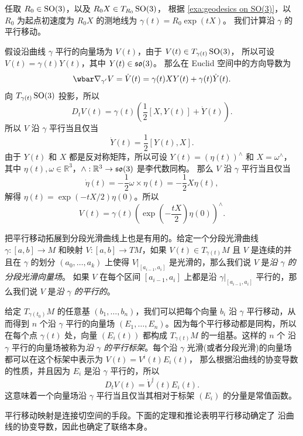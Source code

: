 \begin{example}[$\SO(3)$ 上的平行移动]
  任取 $R_0\in \operatorname{SO}(3)$，以及 $R_0X\in T_{R_0}\operatorname{SO}(3)$，
  根据 \autoref{exa:geodesics on SO(3)}，以 $R_0$ 为起点初速度为 $R_0X$ 的测地线为 $\gamma(t)=R_0\exp(tX)$。
  我们计算沿 $\gamma$ 的平行移动。

  假设沿曲线 $\gamma$ 平行的向量场为 $V(t)$，由于 $V(t)\in T_{\gamma(t)}\operatorname{SO}(3)$，
  所以可设 $V(t)=\gamma(t) Y(t)$，其中 $Y(t)\in\mathfrak{so}(3)$。
  那么在 Euclid 空间中的方向导数为
  \[
    \wbar\nabla_{\gamma'}V=\dot V(t)=
    \gamma(t)XY(t)+\gamma(t)\dot Y(t).
  \]
  向 $T_{\gamma(t)}\operatorname{SO}(3)$ 投影，所以
  \[
    D_tV(t)=\gamma(t)\left(
      \frac{1}{2}[X,Y(t)]+\dot Y(t)
    \right).
  \]
  所以 $V$ 沿 $\gamma$ 平行当且仅当
  \[
    \dot Y(t)=\frac{1}{2}[Y(t),X].
  \]
  由于 $Y(t)$ 和 $X$ 都是反对称矩阵，所以可设 $Y(t)=(\eta(t))^\wedge$
  和 $X=\omega^\wedge$，其中 $\eta(t),\omega\in \mathbb{R}^3$，$\wedge:\mathbb{R}^3\to \mathfrak{so}(3)$ 是李代数同构。
  那么 $V$ 沿 $\gamma$ 平行当且仅当
  \[
    \dot \eta(t)=-\frac{1}{2}\omega\times \eta(t)=-\frac{1}{2}X\eta(t),
  \]
  解得 $\eta(t)=\exp(-tX/2)\eta(0)$。所以
  \[
    V(t)=\gamma(t)\left(
      \exp\left(-\frac{tX}{2}\right)\eta(0)
    \right)^\wedge.
  \]
\end{example}

把平行移动拓展到分段光滑曲线上也是有用的。给定一个分段光滑曲线
$\gamma:[a,b]\to M$ 和映射 $V:[a,b]\to TM$，如果 $V(t)\in T_{\gamma(t)}M$ 且
$V$ 是连续的并且在 $\gamma$ 的划分 $(a_0,\dots,a_k)$ 上使得 
$V|_{[a_{i-1},a_i]}$ 是光滑的，那么我们说 $V$ 是\emph{沿 $\gamma$ 的分段光滑向量场}。
如果 $V$ 在每个区间 $[a_{i-1},a_i]$ 上都是沿 $\gamma|_{[a_{i-1},a_i]}$ 平行的，那么我们说 $V$ 是\emph{沿 $\gamma$ 的平行的}。

给定 $T_{\gamma(t_0)}M$ 的任意基 $(b_1,\dots,b_n)$，我们可以把每个向量
$b_i$ 沿 $\gamma$ 平行移动，从而得到 $n$ 个沿 $\gamma$ 平行的向量场
$(E_1,\dots,E_n)$。因为每个平行移动都是同构，所以在每个点 $\gamma(t)$
处，向量 $(E_i(t))$ 都构成 $T_{\gamma(t)}M$ 的一组基。这样的 $n$ 个
沿 $\gamma$ 平行的向量场被称为\emph{沿 $\gamma$ 的平行标架}。每个沿 $\gamma$
光滑(或者分段光滑)的向量场都可以在这个标架中表示为 $V(t)=V^i(t)E_i(t)$，
那么根据沿曲线的协变导数的性质，并且因为 $E_i$ 是沿 $\gamma$ 平行的，所以
\begin{equation}
  D_tV(t)=\dot V^i(t)E_i(t).
\end{equation}
这意味着一个向量场沿 $\gamma$ 平行当且仅当其相对于标架 $(E_i)$ 的分量是常值函数。

平行移动映射是连接切空间的手段。下面的定理和推论表明平行移动确定了
沿曲线的协变导数，因此也确定了联络本身。

